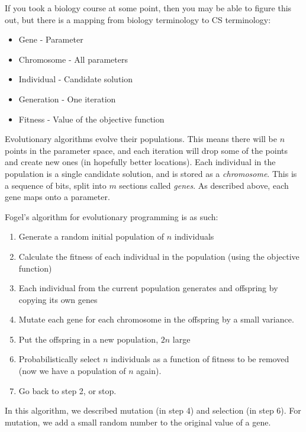 If you took a biology course at some point, then you may be able to figure this
out, but there is a mapping from biology terminology to CS terminology:

\begin{itemize}
  \item Gene  - Parameter
  \item Chromosome - All parameters
  \item Individual - Candidate solution
  \item Generation - One iteration
  \item Fitness - Value of the objective function
\end{itemize}

Evolutionary algorithms evolve their populations. This means there will be $n$
points in the parameter space, and each iteration will drop some of the points
and create new ones (in hopefully better locations). Each individual in the 
population is a single candidate solution, and is stored as a
\textit{chromosome}. This is a sequence of bits, split into $m$ sections called
\textit{genes}. As described above, each gene maps onto a parameter.


Fogel's algorithm for evolutionary programming is as such:

\begin{enumerate}
  \item Generate a random initial population of $n$ individuals
  \item Calculate the fitness of each individual in the population (using the
  objective function)
  \item Each individual from the current population generates and offspring by
  copying its own genes
  \item Mutate each gene for each chromosome in the offspring by a small 
  variance.
  \item Put the offspring in a new population, $2n$ large
  \item Probabilistically select $n$ individuals as a function of fitness to be
  removed (now we have a population of $n$ again).
  \item Go back to step 2, or stop.
\end{enumerate}


In this algorithm, we described mutation (in step 4) and selection (in step 6).
For mutation, we add a small random number to the original value of a gene.

